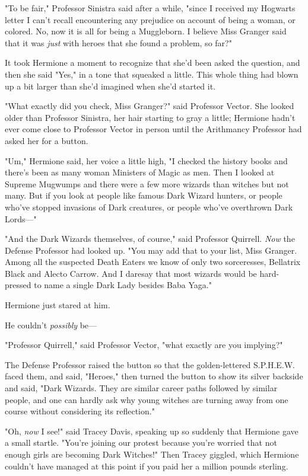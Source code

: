 "To be fair," Professor Sinistra said after a while, "since I received my 
Hogwarts letter I can't recall encountering any prejudice on account of being a 
woman, or colored. No, now it is all for being a Muggleborn. I believe Miss 
Granger said that it was \emph{just} with heroes that she found a problem, so 
far?"

It took Hermione a moment to recognize that she'd been asked the question, and 
then she said "Yes," in a tone that squeaked a little. This whole thing had 
blown up a bit larger than she'd imagined when she'd started it.

"What exactly did you check, Miss Granger?" said Professor Vector. She looked 
older than Professor Sinistra, her hair starting to gray a little; Hermione 
hadn't ever come close to Professor Vector in person until the Arithmancy 
Professor had asked her for a button.

"Um," Hermione said, her voice a little high, "I checked the history books and 
there's been as many woman Ministers of Magic as men. Then I looked at Supreme 
Mugwumps and there were a few more wizards than witches but not many. But if 
you look at people like famous Dark Wizard hunters, or people who've stopped 
invasions of Dark creatures, or people who've overthrown Dark Lords---"

"And the Dark Wizards themselves, of course," said Professor Quirrell. 
\emph{Now} the Defense Professor had looked up. "You may add that to your list, 
Miss Granger. Among all the suspected Death Eaters we know of only two 
sorceresses, Bellatrix Black and Alecto Carrow. And I daresay that most wizards 
would be hard-pressed to name a single Dark Lady besides Baba Yaga."

Hermione just stared at him.

He couldn't \emph{possibly} be---

"Professor Quirrell," said Professor Vector, "what exactly are you implying?"

The Defense Professor raised the button so that the golden-lettered S.P.H.E.W. 
faced them, and said, "Heroes," then turned the button to show its silver 
backside and said, "Dark Wizards. They are similar career paths followed by 
similar people, and one can hardly ask why young witches are turning away from 
one course without considering its reflection."

"Oh, \emph{now} I see!" said Tracey Davis, speaking up so suddenly that 
Hermione gave a small startle. "You're joining our protest because you're 
worried that not enough girls are becoming Dark Witches!" Then Tracey giggled, 
which Hermione couldn't have managed at this point if you paid her a million 
pounds sterling.

